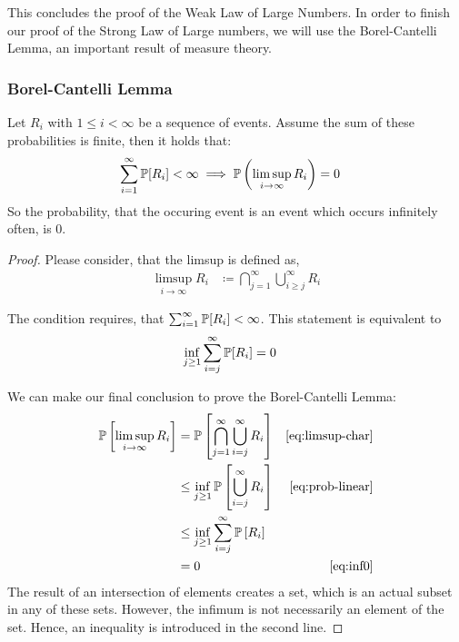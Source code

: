 This concludes the proof of the Weak Law of Large Numbers.
In order to finish our proof of the Strong Law of Large numbers,
we will use the Borel-Cantelli Lemma, an important result of measure theory.

\subsubsection{Borel-Cantelli Lemma}
\label{sec:bp-borel-cantelli}
%
\begin{lemma}\label{lemma:bcl}
  Let $R_i$ with $1 \leq i < \infty$ be a sequence of events.
  Assume the sum of these probabilities is finite, then it holds that:
  \begin{align}
    \sum_{i=1}^\infty \mathbb P[R_i] < \infty
    &\implies
    \mathbb P\left(\limsup\limits_{i\to\infty} R_i\right) = 0
  \end{align}
  So the probability, that the occuring event is an event which occurs infinitely often, is 0.
\end{lemma}

\begin{proof}
  Please consider, that the limsup is defined as,
  \begin{align}
    \limsup\limits_{i\to\infty} R_i &\coloneqq \bigcap_{j=1}^\infty \bigcup_{i \geq j}^\infty R_i \label{eq:limsup-char}
  \end{align}

  The condition requires, that $\sum_{i=1}^\infty \mathbb P[R_i] < \infty$.
  This statement is equivalent to
  \begin{align}
    \inf_{j \geq 1} \sum_{i=j}^\infty \mathbb P[R_i] &= 0  \label{eq:inf0}
  \end{align}

  We can make our final conclusion to prove the Borel-Cantelli Lemma:
  \begin{align}
    \mathbb P\left[\limsup_{i\to\infty} R_i\right]
      &= \mathbb P\left[\bigcap_{j=1}^\infty \bigcup_{i=j}^\infty R_i\right] & \eqref{eq:limsup-char} \notag\\
      &\leq \inf_{j \geq 1} \mathbb P\left[\bigcup_{i=j}^\infty R_i\right] & \eqref{eq:prob-linear}\notag\\
      &\leq \inf_{j \geq 1} \sum_{i=j}^\infty \mathbb P\left[R_i\right] \notag\\
      &= 0 & \eqref{eq:inf0}
  \end{align}
  The result of an intersection of elements creates a set, which
  is an actual subset in any of these sets. However, the infimum
  is not necessarily an element of the set. Hence, an inequality
  is introduced in the second line.
\end{proof}

